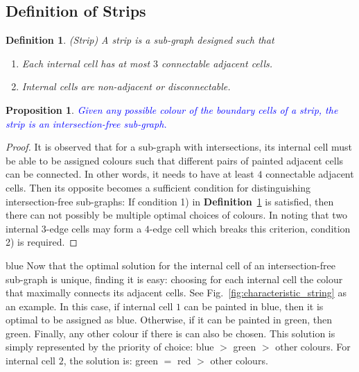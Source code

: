 \documentclass[journal]{IEEEtran}
\newtheorem{definition}[theorem]{Definition}
\newtheorem{proposition}[theorem]{Proposition}
\begin{document}
\subsection{Definition of Strips}\label{sec:strip_solution}



\begin{definition}\label{def:strip}
(Strip) A strip is a sub-graph designed such that
\begin{enumerate}
\item Each internal cell has at most $3$ connectable adjacent cells. 
\item Internal cells are non-adjacent or disconnectable.  
\end{enumerate}
\end{definition}

\begin{proposition}\label{proposition:strips}
\textcolor{blue}{
Given any possible colour of the boundary cells of a strip, the strip is an intersection-free sub-graph. }
\end{proposition}
\begin{proof}
It is observed that for a sub-graph with intersections, its internal cell must be able to be assigned colours such that different pairs of painted adjacent cells can be connected. 
In other words, it needs to have at least $4$ connectable adjacent cells. 
Then its opposite becomes a sufficient condition for distinguishing intersection-free sub-graphs: 
If condition 1) in \textbf{Definition}~\ref{def:strip} is satisfied, then there can not possibly be multiple optimal choices of colours. 
In noting that two internal $3$-edge cells may form a $4$-edge cell which breaks this criterion, condition 2) is required. 
\end{proof}

\begin{color}{blue}
Now that the optimal solution for the internal cell of an intersection-free sub-graph is unique, finding it is easy: choosing for each internal cell the colour that maximally connects its adjacent cells. 
See Fig.~\ref{fig:characteristic_string} as an example. 
In this case, if internal cell $1$ can be painted in blue, then it is optimal to be assigned as blue. 
Otherwise, if it can be painted in green, then green. 
Finally, any other colour if there is can also be chosen. 
This solution is simply represented by the priority of choice: blue $>$ green $>$ other colours. 
For internal cell $2$, the solution is: green $=$ red $>$ other colours. 
\end{color}
\end{document}
